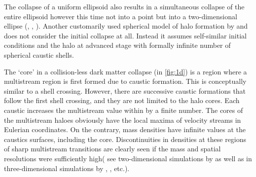 The collapse of a uniform ellipsoid also results in a simultaneous collapse of the entire ellipsoid
however this time not into a point but into a two-dimensional ellipse (\citealt{Lin1965a}, \citealt{Icke1975}, \citealt{Eisenstein1995}).
Another customarily used spherical model of halo formation by \cite{Fillmore1984} and \cite{Bertschinger1985} does not consider
the initial collapse at all. Instead it assumes self-similar initial conditions and the halo at advanced stage with formally infinite number of spherical caustic shells.

The `core' in a collision-less dark matter collapse (in \autoref{fig:1d}) is a region where a multistream region is first formed due to caustic formation. This is conceptually similar to a shell crossing. However, there are successive caustic formations that follow the first shell crossing, and they are not limited to the halo cores. Each caustic increases the multistream value within by a finite number. The cores of the multistream haloes obviously have the local maxima of velocity streams in Eulerian coordinates. On the contrary, mass densities have infinite values at the caustics surfaces, including the core. Discontinuities in densities at these regions of sharp multistream transitions are clearly seen if the mass and spatial resolutions were sufficiently high( see two-dimensional simulations by \citealt{Melott1989} as well as in three-dimensional simulations by \citealt{Hahn2013}, \citealt{Angulo2016}, \citealt{Hahn2016a} etc.). 

